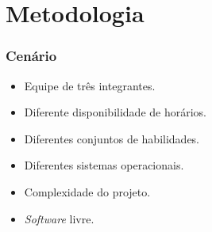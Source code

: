 \section{Metodologia}

\frame
{
\frametitle{Cenário}
\begin{itemize}
	\item Equipe de três integrantes.
	\item Diferente disponibilidade de horários.
	\item Diferentes conjuntos de habilidades.
	\item Diferentes sistemas operacionais.
	\item Complexidade do projeto.
	\item \emph{Software} livre.
\end{itemize}
}

